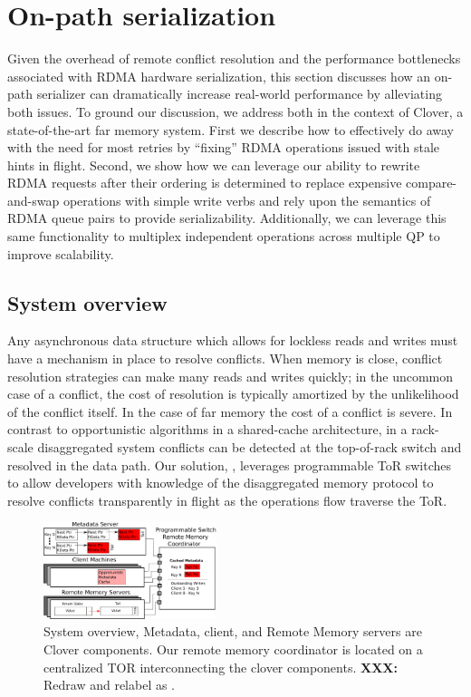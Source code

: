 \section{On-path serialization}

Given the overhead of remote conflict resolution and the performance
bottlenecks associated with RDMA hardware serialization, this section
discusses how an on-path serializer can dramatically increase
real-world performance by alleviating both issues.  To ground our
discussion, we address both in the context of Clover, a
state-of-the-art far memory system.  First we describe how to
effectively do away with the need for most retries by ``fixing'' RDMA
operations issued with stale hints in flight.  Second, we show how we
can leverage our ability to rewrite RDMA requests after their ordering
is determined to replace expensive compare-and-swap operations with
simple write verbs and rely upon the semantics of RDMA queue pairs to
provide serializability. Additionally, we can leverage this same
functionality to multiplex independent operations across multiple QP
to improve scalability.


\subsection{System overview}

Any asynchronous data structure which allows for lockless reads and
writes must have a mechanism in place to resolve conflicts. When
memory is close, conflict resolution strategies can make many reads
and writes quickly; in the uncommon case of a conflict, the cost of
resolution is typically amortized by the unlikelihood of the conflict
itself. In the case of far memory the cost of a conflict is severe. In
contrast to opportunistic algorithms in a shared-cache architecture,
in a rack-scale disaggregated system conflicts can be detected at the
top-of-rack switch and resolved in the data path. Our solution,
\sword, leverages programmable ToR switches to allow developers with
knowledge of the disaggregated memory protocol to resolve conflicts
transparently in flight as the operations flow traverse the ToR.

\begin{figure}
    \includegraphics[width=0.45\textwidth]{fig/overview.pdf}
    \caption{ System overview, Metadata, client, and Remote Memory
    servers are Clover components. Our remote memory coordinator is
    located on a centralized TOR interconnecting the clover components.
    \textbf{XXX:} Redraw and relabel as \sword.}
    \label{fig:overview} 
\end{figure}

